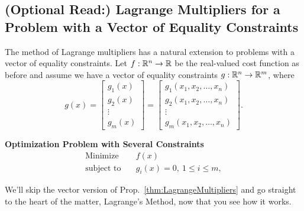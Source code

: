 \subsection{(Optional Read:) Lagrange Multipliers for a Problem with a Vector of Equality Constraints}

The method of Lagrange multipliers has a natural extension to problems with a vector of equality constraints. 
Let $f:\mathbb R^n \to \mathbb R$ be the real-valued cost function as before and assume we have a vector of equality constraints $g:\mathbb R^n \to \mathbb R^m$, where
$$g(x) = \left[\begin{array}{c}
g_1(x) \\
g_2(x) \\
\vdots \\
g_m(x)
\end{array} \right] = \left[\begin{array}{c}
g_1(x_1, x_2, \ldots, x_n) \\
g_2(x_1, x_2, \ldots, x_n) \\
\vdots \\
g_m(x_1, x_2, \ldots, x_n)
\end{array} \right].$$


\textbf{Optimization Problem with Several Constraints}
\begin{equation}
\label{eq:GenericMultipleConstraintOptimizationProblem01}
\begin{aligned}
\text{Minimize} \quad & f(x)\\
\text{subject to} \quad & g_i(x) = 0, ~ 1\le i \le m,
\end{aligned}    
\end{equation}

 We'll skip the vector version of Prop.~\ref{thm:LagrangeMultipliers} and go straight to the heart of the matter, Lagrange's Method, now that you see how it works. 


